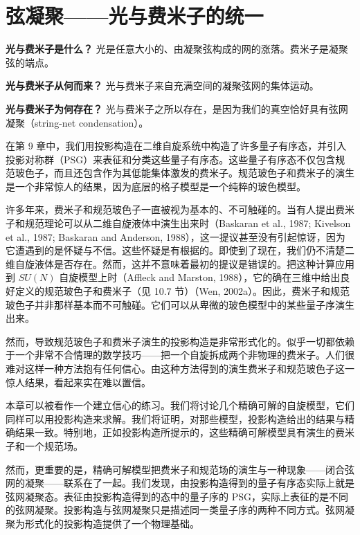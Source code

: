 

\chapter{弦凝聚——光与费米子的统一}

\begin{keypoints}
\item \textbf{光与费米子是什么？} 光是任意大小的、由凝聚弦构成的网的涨落。费米子是凝聚弦的端点。
\item \textbf{光与费米子从何而来？} 光与费米子来自充满空间的凝聚弦网的集体运动。
\item \textbf{光与费米子为何存在？} 光与费米子之所以存在，是因为我们的真空恰好具有弦网凝聚（string-net condensation）。
\end{keypoints}

在第 9 章中，我们用投影构造在二维自旋系统中构造了许多量子有序态，并引入投影对称群（PSG）来表征和分类这些量子有序态。这些量子有序态不仅包含规范玻色子，而且还包含作为其低能集体激发的费米子。规范玻色子和费米子的演生是一个非常惊人的结果，因为底层的格子模型是一个纯粹的玻色模型。

许多年来，费米子和规范玻色子一直被视为基本的、不可触碰的。当有人提出费米子和规范理论可以从二维自旋液体中演生出来时（Baskaran et al., 1987; Kivelson et al., 1987; Baskaran and Anderson, 1988），这一提议甚至没有引起惊讶，因为它遭遇到的是怀疑与不信。这些怀疑是有根据的。即使到了现在，我们仍不清楚二维自旋液体是否存在。然而，这并不意味着最初的提议是错误的。把这种计算应用到 $SU(N)$ 自旋模型上时（Affleck and Marston, 1988），它的确在三维中给出良好定义的规范玻色子和费米子（见 10.7 节）（Wen, 2002a）。因此，费米子和规范玻色子并非那样基本而不可触碰。它们可以从卑微的玻色模型中的某些量子序演生出来。

然而，导致规范玻色子和费米子演生的投影构造是非常形式化的。似乎一切都依赖于一个非常不合情理的数学技巧——把一个自旋拆成两个非物理的费米子。人们很难对这样一种方法抱有任何信心。由这种方法得到的演生费米子和规范玻色子这一惊人结果，看起来实在难以置信。

本章可以被看作一个建立信心的练习。我们将讨论几个精确可解的自旋模型，它们同样可以用投影构造来求解。我们将证明，对那些模型，投影构造给出的结果与精确结果一致。特别地，正如投影构造所提示的，这些精确可解模型具有演生的费米子和一个规范场。

然而，更重要的是，精确可解模型把费米子和规范场的演生与一种现象——闭合弦网的凝聚——联系在了一起。我们发现，由投影构造得到的量子有序态实际上就是弦网凝聚态。表征由投影构造得到的态中的量子序的 PSG，实际上表征的是不同的弦网凝聚。投影构造与弦网凝聚只是描述同一类量子序的两种不同方式。弦网凝聚为形式化的投影构造提供了一个物理基础。

